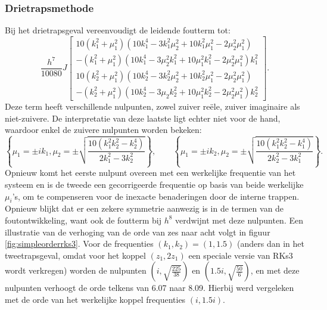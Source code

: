 \documentclass[12pt]{article}
\begin{document}
\subsubsection{Drietrapsmethode}
Bij het drietrapsgeval vereenvoudigt de leidende foutterm tot:
\begin{equation*}
    \frac{h^7}{10080}J
    \begin{bmatrix}
    10(k_1^2+\mu_1^2)(10k_1^4-3k_1^2\mu_2^2+10k_1^2\mu_1^2-2\mu_2^2\mu_1^2) \\
    -(k_1^2+\mu_1^2)(10k_1^4-3\mu_2^2k_1^2+10\mu_1^2k_1^2-2\mu_2^2\mu_1^2)k_1^2 \\
    10(k_2^2+\mu_1^2)(10k_2^4-3k_2^2\mu_2^2+10k_2^2\mu_1^2-2\mu_2^2\mu_1^2) \\
    -(k_2^2+\mu_1^2)(10k_2^4-3\mu_2k_2^2+10\mu_1^2k_2^2-2\mu_2^2\mu_1^2)k_2^2
    \end{bmatrix}.
\end{equation*}
Deze term heeft verschillende nulpunten, zowel zuiver reële, zuiver imaginaire als niet-zuivere. De interpretatie van deze laatste ligt echter niet voor de hand, waardoor enkel de zuivere nulpunten worden bekeken:
\[\left\{\mu_1=\pm ik_1,\mu_2=\pm\sqrt{\frac{10(k_1^2k_2^2-k_2^4)}{2k_1^2-3k_2^2}}\right\},\qquad\left\{\mu_1=\pm ik_2,\mu_2=\pm\sqrt{\frac{10(k_1^2k_2^2-k_1^4)}{2k_2^2-3k_1^2}}\right\}.\]
Opnieuw komt het eerste nulpunt overeen met een werkelijke frequentie van het systeem en is de tweede een gecorrigeerde frequentie op basis van beide werkelijke \(\mu_i\)'s, om te compenseren voor de inexacte benaderingen door de interne trappen. Opnieuw blijkt dat er een zekere symmetrie aanwezig is in de termen van de foutontwikkeling, want ook de foutterm bij \(h^8\) verdwijnt met deze nulpunten. Een illustratie van de verhoging van de orde van zes naar acht volgt in figuur \ref{fig:simpleorderrks3}. Voor de frequenties \((k_1,k_2)=(1,1.5)\) (anders dan in het tweetrapsgeval, omdat voor het koppel \((z_1,2z_1)\) een speciale versie van RKs3 wordt verkregen) worden de nulpunten \((i,\sqrt{\frac{225}{38}})\) en \((1.5i,\sqrt{\frac{50}{6}})\), en met deze nulpunten verhoogt de orde telkens van 6.07 naar 8.09. Hierbij werd vergeleken met de orde van het werkelijke koppel frequenties \((i,1.5i)\).
\end{document}
